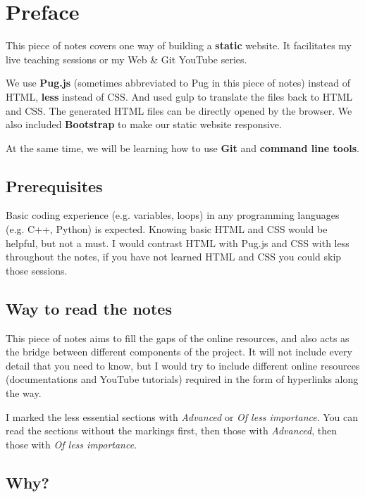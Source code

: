 \chapter*{Preface}

This piece of notes covers one way of building a \textbf{static} website. It facilitates my live teaching sessions or my Web \& Git YouTube series.
\vspace{6mm}

We use \textbf{Pug.js} (sometimes abbreviated to Pug in this piece of notes) instead of HTML, \textbf{less} instead of CSS. And used gulp to translate the files back to HTML and CSS. The generated HTML files can be directly opened by the browser. We also included \textbf{Bootstrap} to make our static website responsive.
\vspace{6mm}

At the same time, we will be learning how to use \textbf{Git} and \textbf{command line tools}.

\section{Prerequisites}

Basic coding experience (e.g. variables, loops) in any programming languages (e.g. C++, Python) is expected. Knowing basic HTML and CSS would be helpful, but not a must. I would contrast HTML with Pug.js and CSS with less throughout the notes, if you have not learned HTML and CSS you could skip those sessions.

\section{Way to read the notes}

This piece of notes aims to fill the gaps of the online resources, and also acts as the bridge between different components of the project. It will not include every detail that you need to know, but I would try to include different online resources (documentations and YouTube tutorials) required in the form of hyperlinks along the way.

\vspace{6mm}

I marked the less essential sections with \textit{Advanced} or \textit{Of less importance}. You can read the sections without the markings first, then those with \textit{Advanced}, then those with \textit{Of less importance}.

\section{Why?}


